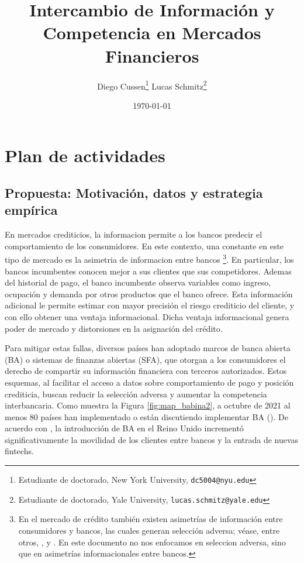 \documentclass[11pt]{article}
\theoremstyle{plain}
\theoremstyle{plain}
\begin{document}

 
\title{%
{\Large Intercambio de Información y Competencia en Mercados Financieros}}
\author{
Diego Cussen\thanks{Estudiante de doctorado, New York University, \texttt{dc5004@nyu.edu}}
\quad \quad 
Lucas Schmitz\thanks{Estudiante de doctorado, Yale University,  \texttt{lucas.schmitz@yale.edu}}
} 
\date{\today}

\maketitle

\section{Plan de actividades}

\subsection{Propuesta: Motivación, datos y estrategia empírica}


En mercados crediticios, la informacion permite a los bancos predecir el comportamiento de los consumidores. En este contexto, una constante en este tipo de mercado es la asimetria de informacion entre bancos
\footnote{En el mercado de crédito también existen asimetrías de información entre consumidores y bancos, las cuales generan selección adversa; véase, entre otros, \textcite{rothschild_equilibrium_1976}, \textcite{einav_selection_2011} y \textcite{einav_io_2021}. En este documento no nos enfocamos en seleccion adversa, sino que en asimetrías informacionales entre bancos.}.  
En particular, los bancos incumbentes conocen mejor a sus clientes que sus competidores.  Ademas del historial de pago, el banco incumbente observa variables como ingreso, ocupación y demanda por otros productos que el banco ofrece. Esta información adicional le permite estimar con mayor precisión el riesgo crediticio del cliente, y con ello obtener una ventaja informacional. Dicha ventaja informacional genera poder de mercado y distorsiones en la asignación del crédito. 



Para mitigar estas fallas, diversos países han adoptado marcos de banca abierta (BA) o sistemas de finanzas abiertas (SFA), que otorgan a los consumidores el derecho de compartir su información financiera con terceros autorizados. Estos esquemas, al facilitar el acceso a datos sobre comportamiento de pago y posición crediticia, buscan reducir la selección adversa y aumentar la competencia interbancaria. Como muestra la Figura \ref{fig:map_babina2}, a octubre de 2021 al menos 80 países han implementado o están discutiendo implementar BA (\cite{babina_customer_2025}). De acuerdo con \textcite{babina_customer_2025}, la introducción de BA en el Reino Unido incrementó significativamente la movilidad de los clientes entre bancos y la entrada de nuevas fintechs.
\end{document}
